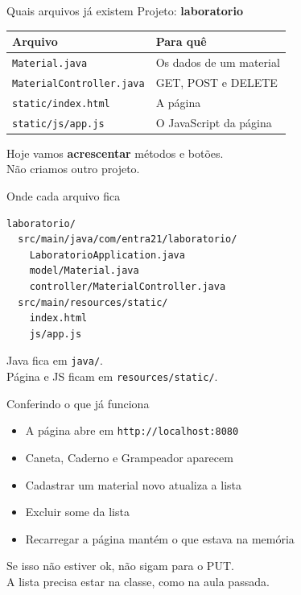 \documentclass[aspectratio=169,11pt]{beamer}
\begin{document}
\begin{frame}{Quais arquivos já existem}
  Projeto: \textbf{laboratorio}

  \vspace{0.4em}
  \begin{center}
  \begin{tabular}{ll}
    \toprule
    Arquivo & Para quê \\
    \midrule
    \texttt{Material.java} & Os dados de um material \\
    \texttt{MaterialController.java} & GET, POST e DELETE \\
    \texttt{static/index.html} & A página \\
    \texttt{static/js/app.js} & O JavaScript da página \\
    \bottomrule
  \end{tabular}
  \end{center}

  \vspace{0.5em}
  Hoje vamos \textbf{acrescentar} métodos e botões.\\
  Não criamos outro projeto.
\end{frame}

\begin{frame}[fragile]{Onde cada arquivo fica}
\begin{lstlisting}[basicstyle=\ttfamily\footnotesize]
laboratorio/
  src/main/java/com/entra21/laboratorio/
    LaboratorioApplication.java
    model/Material.java
    controller/MaterialController.java
  src/main/resources/static/
    index.html
    js/app.js
\end{lstlisting}

  Java fica em \texttt{java/}.\\
  Página e JS ficam em \texttt{resources/static/}.
\end{frame}

\begin{frame}{Conferindo o que já funciona}
  \begin{itemize}
    \item [ ] A página abre em \texttt{http://localhost:8080}
    \item [ ] Caneta, Caderno e Grampeador aparecem
    \item [ ] Cadastrar um material novo atualiza a lista
    \item [ ] Excluir some da lista
    \item [ ] Recarregar a página mantém o que estava na memória
  \end{itemize}

  \vspace{0.5em}
  Se isso não estiver ok, não sigam para o PUT.\\
  A lista precisa estar na classe, como na aula passada.
\end{frame}
\end{document}
